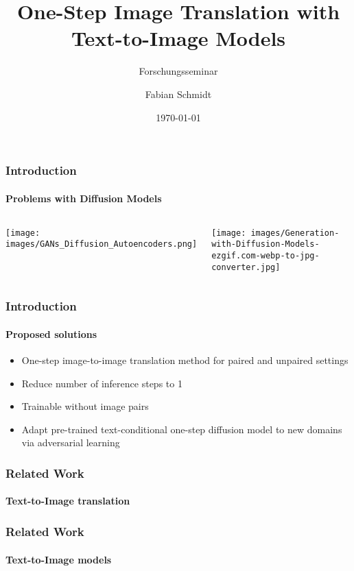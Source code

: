 \documentclass[aspectratio=169, lecture, amberg]{OTHAWbeamer}
\title[Forschungsseminar]{One-Step Image Translation with Text-to-Image Models}
\subtitle{Forschungsseminar}
\author[Schmidt]{Fabian Schmidt}
\date{\today}
\begin{document}
\maketitle

\begin{frame}
\frametitle{Introduction}
\framesubtitle{Problems with Diffusion Models}

\begin{columns}
    \centering
    \texttt{[image: images/GANs\_Diffusion\_Autoencoders.png]}

    \centering
    \texttt{[image: images/Generation-with-Diffusion-Models-ezgif.com-webp-to-jpg-converter.jpg]}
  \end{columns}
\end{frame}


\begin{frame}
\frametitle{Introduction}
\framesubtitle{Proposed solutions}
\begin{itemize}
    \item One-step image-to-image translation method for paired and unpaired settings
    \item Reduce number of inference steps to 1
    \item Trainable without image pairs
    \item Adapt pre-trained text-conditional one-step diffusion model to new domains via adversarial learning
\end{itemize}
\end{frame}

\begin{frame}
\frametitle{Related Work}
\framesubtitle{Text-to-Image translation}

\end{frame}

\begin{frame}
\frametitle{Related Work}
\framesubtitle{Text-to-Image models}

\end{frame}
\end{document}
